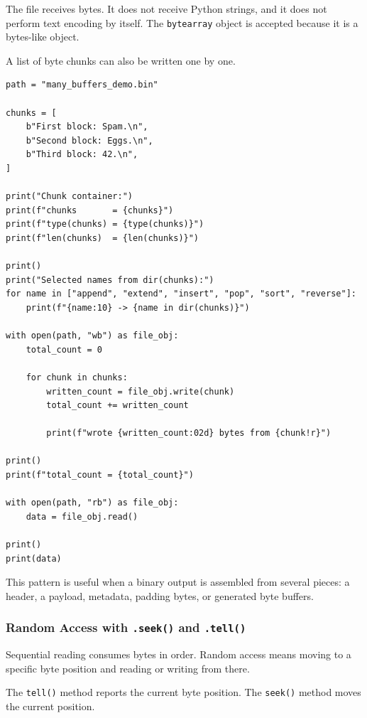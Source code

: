 The file receives bytes. It does not receive Python strings, and it does not perform text encoding by itself. The \texttt{bytearray} object is accepted because it is a bytes-like object.

A list of byte chunks can also be written one by one.

\begin{verbatim}
path = "many_buffers_demo.bin"

chunks = [
    b"First block: Spam.\n",
    b"Second block: Eggs.\n",
    b"Third block: 42.\n",
]

print("Chunk container:")
print(f"chunks       = {chunks}")
print(f"type(chunks) = {type(chunks)}")
print(f"len(chunks)  = {len(chunks)}")

print()
print("Selected names from dir(chunks):")
for name in ["append", "extend", "insert", "pop", "sort", "reverse"]:
    print(f"{name:10} -> {name in dir(chunks)}")

with open(path, "wb") as file_obj:
    total_count = 0

    for chunk in chunks:
        written_count = file_obj.write(chunk)
        total_count += written_count

        print(f"wrote {written_count:02d} bytes from {chunk!r}")

print()
print(f"total_count = {total_count}")

with open(path, "rb") as file_obj:
    data = file_obj.read()

print()
print(data)
\end{verbatim}

This pattern is useful when a binary output is assembled from several pieces: a header, a payload, metadata, padding bytes, or generated byte buffers.

\subsubsection{Random Access with \texttt{.seek()} and \texttt{.tell()}}

Sequential reading consumes bytes in order. Random access means moving to a specific byte position and reading or writing from there.

The \texttt{tell()} method reports the current byte position. The \texttt{seek()} method moves the current position.


